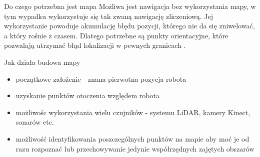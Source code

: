 

\begin{frame}{Do czego potrzebna jest mapa}
	Możliwa jest nawigacja bez wykorzystania mapy, w tym wypadku wykorzystuje się tak zwaną nawigację zliczeniową. 
	Jej wykorzystanie powoduje akumulację błędu pozycji, którego nie da się zniwelować,
	a który rośnie z czasem.
	Dlatego potrzebne są punkty orientacyjne, które pozwalają utrzymać błąd lokalizacji w pewnych granicach \cite{robotics_vision_dead_reckon}.
\end{frame}

\begin{frame}{Jak działa budowa mapy}
	\begin{itemize}
		\item początkowe założenie - znana pierwotna pozycja robota
		\item uzyskanie punktów otoczenia względem robota
		\item możliwośc wykorzystania wielu czujników - systemu LiDAR, kamery Kinect, sonarów etc.
		\item możliwość identyfikowania poszczególnych punktów na mapie aby moć je od razu rozpoznać lub przechowywanie jedynie współrzędnych zajętych obszarów
	\end{itemize}
\end{frame}

